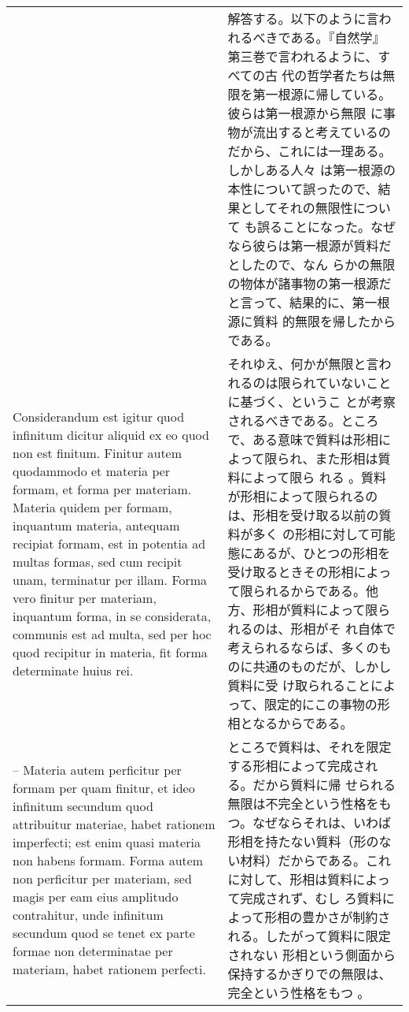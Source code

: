 \documentclass[10pt]{jsarticle} %
\begin{document}
\begin{longtable}{p{21em}p{21em}}
&

解答する。以下のように言われるべきである。『自然学』第三巻で言われるように、すべての古
 代の哲学者たちは無限を第一根源に帰している。彼らは第一根源から無限
 に事物が流出すると考えているのだから、これには一理ある。しかしある人々
 は第一根源の本性について誤ったので、結果としてそれの無限性について
 も誤ることになった。なぜなら彼らは第一根源が質料だとしたので、なん
 らかの無限の物体が諸事物の第一根源だと言って、結果的に、第一根源に質料
 的無限を帰したからである。



\\


Considerandum est igitur quod infinitum dicitur aliquid ex eo quod non
est finitum. Finitur autem quodammodo et materia per formam, et forma
per materiam. Materia quidem per formam, inquantum materia, antequam
recipiat formam, est in potentia ad multas formas, sed cum recipit unam,
terminatur per illam. Forma vero finitur per materiam, inquantum forma,
in se considerata, communis est ad multa, sed per hoc quod recipitur in
materia, fit forma determinate huius rei. 

&

それゆえ、何かが無限と言われるのは限られていないことに基づく、というこ
 とが考察されるべきである。ところ
 で、ある意味で質料は形相によって限られ、また形相は質料によって限ら
 れる 。質料が形相によって限られるのは、形相を受け取る以前の質料が多く
 の形相に対して可能態にあるが、ひとつの形相を受け取るときその形相によっ
 て限られるからである。他方、形相が質料によって限られるのは、形相がそ
 れ自体で考えられるならば、多くのものに共通のものだが、しかし質料に受
 け取られることによって、限定的にこの事物の形相となるからである。




\\


-- Materia autem perficitur per formam per quam finitur, et ideo infinitum
secundum quod attribuitur materiae, habet rationem imperfecti; est enim
quasi materia non habens formam. Forma autem non perficitur per
materiam, sed magis per eam eius amplitudo contrahitur, unde infinitum
secundum quod se tenet ex parte formae non determinatae per materiam,
habet rationem perfecti.

&

ところで質料は、それを限定する形相によって完成される。だから質料に帰
せられる無限は不完全という性格をもつ。なぜならそれは、いわば形相を持たない質料（形のな
 い材料）だからである。これに対して、形相は質料によって完成されず、むし
 ろ質料によって形相の豊かさが制約される。したがって質料に限定されない
 形相という側面から保持するかぎりでの無限は、完全という性格をもつ 。




\end{longtable}
\end{document}
